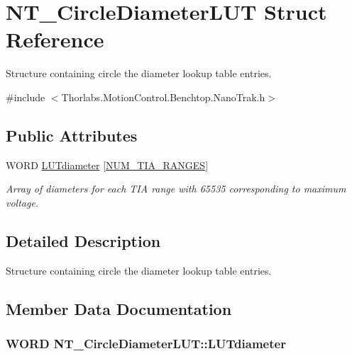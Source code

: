 \hypertarget{struct_n_t___circle_diameter_l_u_t}{}\section{N\+T\+\_\+\+Circle\+Diameter\+L\+UT Struct Reference}
\label{struct_n_t___circle_diameter_l_u_t}


Structure containing circle the diameter lookup table entries.  




{\ttfamily \#include $<$Thorlabs.\+Motion\+Control.\+Benchtop.\+Nano\+Trak.\+h$>$}

\subsection*{Public Attributes}
\begin{DoxyCompactItemize}
\item 
W\+O\+RD \hyperlink{struct_n_t___circle_diameter_l_u_t_acfcb2a618229cc6e7b1db9e660b8afb5}{L\+U\+Tdiameter} \mbox{[}\hyperlink{group___benchtop_nano_trak_ga71c4ccd426f774dbc92d38deb456bdb1}{N\+U\+M\+\_\+\+T\+I\+A\+\_\+\+R\+A\+N\+G\+ES}\mbox{]}
\begin{DoxyCompactList}\small\item\em Array of diameters for each T\+IA range with 65535 corresponding to maximum voltage. \end{DoxyCompactList}\end{DoxyCompactItemize}


\subsection{Detailed Description}
Structure containing circle the diameter lookup table entries. 



\subsection{Member Data Documentation}
\subsubsection[{\texorpdfstring{L\+U\+Tdiameter}{LUTdiameter}}]{\setlength{\rightskip}{0pt plus 5cm}W\+O\+RD N\+T\+\_\+\+Circle\+Diameter\+L\+U\+T\+::\+L\+U\+Tdiameter}\hypertarget{struct_n_t___circle_diameter_l_u_t_acfcb2a618229cc6e7b1db9e660b8afb5}{}\label{struct_n_t___circle_diameter_l_u_t_acfcb2a618229cc6e7b1db9e660b8afb5}


